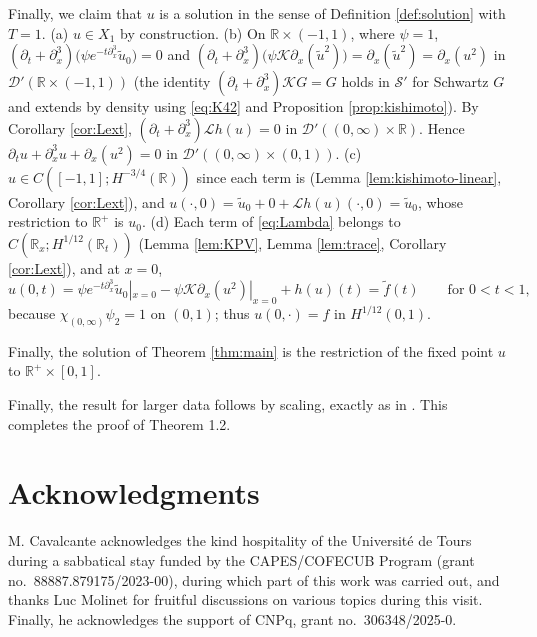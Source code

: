 \documentclass[10pt,reqno]{amsart}
\theoremstyle{remark}
\numberwithin{equation}{section}
\newcommand{\R}{\mathbb R}
\newcommand{\pd}{\partial}
\newcommand{\Lc}{\mathcal{L}}
\newcommand{\Kc}{\mathcal{K}}
\begin{document}
\medskip\noindent Finally, we claim that $u$ is a solution in the sense of Definition \ref{def:solution} with $T=1$.
(a) $u\in X_1$ by construction. (b) On $\R\times(-1,1)$, where $\psi=1$, $(\pd_t+\pd_x^3)\big(\psi e^{-t\pd_x^3}\tilde u_0\big)=0$ and $(\pd_t+\pd_x^3)\big(\psi\Kc\pd_x(\tilde u^2)\big)=\pd_x(\tilde u^2)=\pd_x(u^2)$ in $\mathcal D'(\R\times(-1,1))$ (the identity $(\pd_t+\pd_x^3)\Kc G=G$ holds in $\mathcal S'$ for Schwartz $G$ and extends by density using \eqref{eq:K42} and Proposition \ref{prop:kishimoto}). By Corollary \ref{cor:Lext}, $(\pd_t+\pd_x^3)\Lc h(u)=0$ in $\mathcal D'((0,\infty)\times\R)$. Hence $\pd_tu+\pd_x^3u+\pd_x(u^2)=0$ in $\mathcal D'((0,\infty)\times(0,1))$. (c) $u\in C([-1,1];H^{-3/4}(\R))$ since each term is (Lemma \ref{lem:kishimoto-linear}, Corollary \ref{cor:Lext}), and $u(\cdot,0)=\tilde u_0+0+\Lc h(u)(\cdot,0)=\tilde u_0$, whose restriction to $\R^+$ is $u_0$. (d) Each term of \eqref{eq:Lambda} belongs to $C(\R_x;H^{1/12}(\R_t))$ (Lemma \ref{lem:KPV}, Lemma \ref{lem:trace}, Corollary \ref{cor:Lext}), and at $x=0$,
$$u(0,t)=\psi e^{-t\pd_x^3}\tilde u_0|_{x=0}-\psi\Kc\pd_x(u^2)|_{x=0}+h(u)(t)=\tilde f(t)\qquad\text{for }0<t<1,$$
because $\chi_{(0,\infty)}\psi_2=1$ on $(0,1)$; thus $u(0,\cdot)=f$ in $H^{1/12}(0,1)$.

Finally, the solution of Theorem \ref{thm:main} is the restriction of the fixed point $u$ to $\R^{+}\times[0,1]$.

Finally, the result for larger data follows by scaling, exactly as in \cite{Holmer}. This completes the proof of Theorem 1.2.



\section*{Acknowledgments}
M. Cavalcante acknowledges the kind hospitality of the Université de Tours during a sabbatical stay funded by the CAPES/COFECUB Program (grant no.~88887.879175/2023-00), during which part of this work was carried out, and thanks Luc Molinet for fruitful discussions on various topics during this visit. Finally, he acknowledges the support of CNPq, grant no.~306348/2025-0.

\medskip
\end{document}
